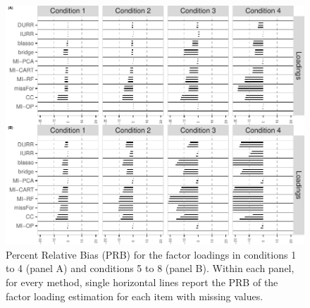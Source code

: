 \begin{figure}
	\includegraphics{../../output/graphs/exp2_CFA_lambda_BPR_summy.pdf}
	\caption{
		Percent Relative Bias (PRB) for the factor loadings in conditions 1 to 4 (panel A) 
		and conditions 5 to 8 (panel B).
		Within each panel, for every method, single horizontal lines report the PRB of the 
		factor loading estimation for each item with missing values.
		}
\label{fig:exp2fl14}
\end{figure}

\FloatBarrier %

